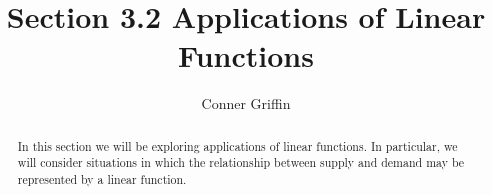\documentclass{ximera}
\title{Section 3.2 Applications of Linear Functions}
\author{Conner Griffin}
\begin{document}
\begin{abstract}
    In this section we will be exploring applications of linear functions. In particular, we will consider situations in which the relationship between supply and demand may be represented by a linear function.
\end{abstract}
\maketitle






\end{document}
